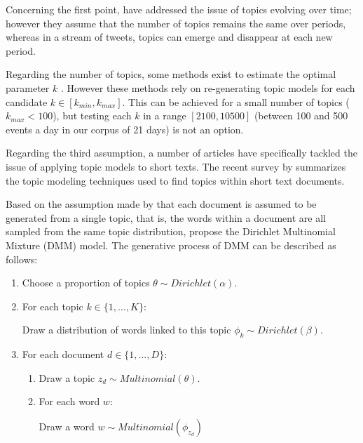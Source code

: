 	Concerning the first point, \citet{blei_dynamic_2006} have addressed the issue of topics evolving over time; however they assume that the number of topics remains the same over periods, whereas in a stream of tweets, topics can emerge and disappear at each new period.
	
	Regarding the number of topics, some methods exist to estimate the optimal parameter $k$  \citep{brunet_metagenes_2004,arun_finding_2010,greene_how_2014}. However these methods rely on re-generating topic models for each candidate $k \in [k_{min}, k_{max}]$. This can be achieved for a small number of topics ($k_{max} < 100$), but testing each $k$ in a range $[2100, 10500]$ (between 100 and 500 events a day in our corpus of 21 days) is not an option. 
	
	Regarding the third assumption, a number of articles have specifically tackled the issue of applying topic models to short texts. The recent survey by \citet{likhitha975detailed} summarizes the topic modeling techniques used to find topics within short text documents.
    
    Based on the assumption made by \citet{nigam2000text} that each document is assumed to be generated from a single topic, that is, the words within a document are all sampled from the same topic distribution, \citet{yin_dirichlet_2014} propose the Dirichlet Multinomial Mixture (DMM) model. The generative process of DMM can be described as follows: 
    \begin{center}
        	\begin{enumerate}
	 	\item Choose a proportion of topics $\theta \sim Dirichlet(\alpha)$.
	 	\item For each topic $k \in \lbrace1,\ldots,K\rbrace$:
	 	 
			Draw a distribution of words linked to this topic $\phi_k \sim Dirichlet(\beta)$.
		\item For each document $d \in \lbrace1,\ldots,D\rbrace$:
		\begin{enumerate}
		    \item Draw a topic $z_d \sim Multinomial(\theta)$.
		    \item For each word $w$:
		    
		    Draw a word $w \sim Multinomial(\phi_{z_d})$
		    
		\end{enumerate}	 	  
	 \end{enumerate}
    \end{center}

